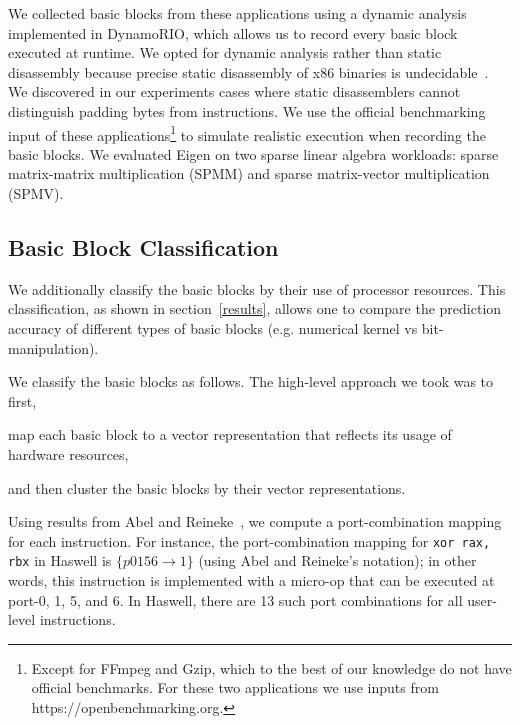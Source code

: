 We collected basic blocks from these applications using
a dynamic analysis implemented in DynamoRIO\cite{dynamorio},
which allows us to record every basic block
executed at runtime.
We opted for dynamic analysis rather than static disassembly
because precise static disassembly of x86 binaries
is undecidable~\cite{disassembly-undecidable}.
We discovered in our experiments cases where
static disassemblers cannot distinguish padding bytes from instructions.
We use the official benchmarking input of these applications\footnote{
Except for FFmpeg and Gzip, which to the best of our knowledge do not have
official benchmarks. For these two applications we use inputs
from https://openbenchmarking.org.
} to simulate realistic execution when recording the basic blocks.
We evaluated Eigen on two sparse linear algebra workloads:
sparse matrix-matrix multiplication (SPMM) and 
sparse matrix-vector multiplication (SPMV).

\subsection{Basic Block Classification}\label{classification}
We additionally classify the basic blocks by their use of processor resources.
This classification, as shown in section~\ref{results},
allows one to compare the prediction accuracy of different types of basic blocks 
(e.g. numerical kernel vs bit-manipulation).

We classify the basic blocks as follows.
The high-level approach we took was to first,
\begin{enumerate*}
\item map each basic block to a vector representation
that reflects its usage of hardware resources,
\item and then cluster the basic blocks by their vector representations.
\end{enumerate*}

Using results from Abel and Reineke~\cite{uops},
we compute a port-combination mapping for each instruction.
For instance,
the port-combination mapping for \verb|xor rax, rbx| in Haswell
is $\{ p0156 \rightarrow 1 \}$ (using Abel and Reineke's notation);
in other words, this instruction is implemented 
with a micro-op that can be executed at port-0, 1, 5, and 6.
In Haswell, there are 13 such port combinations for all user-level instructions.

